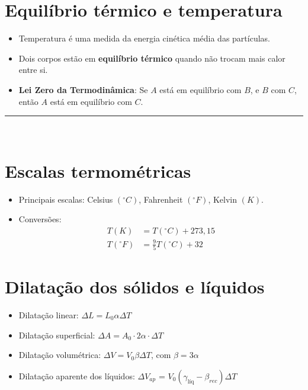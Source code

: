 \documentclass[a4paper,12pt]{article}
\begin{document}
\begin{multicols}{2}
\section{Equilíbrio térmico e temperatura}
\begin{itemize}
    \item Temperatura é uma medida da energia cinética média das partículas.
    \item Dois corpos estão em \textbf{equilíbrio térmico} quando não trocam mais calor entre si.
    \item \textbf{Lei Zero da Termodinâmica}: Se $A$ está em equilíbrio com $B$, e $B$ com $C$, então $A$ está em equilíbrio com $C$.
\end{itemize}

\noindent\rule{\linewidth}{1pt}\\

\section{Escalas termométricas}

\begin{itemize}
    \item Principais escalas: Celsius $(^\circ C)$, Fahrenheit $(^\circ F)$, Kelvin $(K)$.
    \item Conversões:
    \begin{align*}
        T(K) &= T(^\circ C) + 273{,}15 \\
        T(^\circ F) &= \frac{9}{5}T(^\circ C) + 32
    \end{align*}
\end{itemize}

\section{Dilatação dos sólidos e líquidos}
\begin{itemize}
    \item Dilatação linear: $\Delta L = L_0 \alpha \Delta T$
    \item Dilatação superficial: $\Delta A = A_0 \cdot 2\alpha \cdot \Delta T$
    \item Dilatação volumétrica: $\Delta V = V_0 \beta \Delta T$, com $\beta = 3\alpha$
    \item Dilatação aparente dos líquidos: $\Delta V_{ap}$  = $V_0 (\gamma_{\text{líq}} -\beta_{rec}) \Delta T$
\end{itemize}


\end{multicols}
\end{document}
